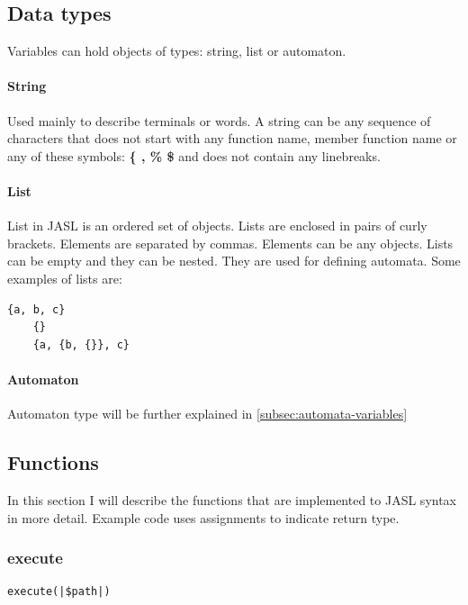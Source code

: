 \documentclass{ctuthesis}
\begin{document}
\subsection{Data types}
Variables can hold objects of types: string, list or automaton.
\paragraph{String} Used mainly to describe terminals or words. A string can be any sequence of characters that does not start with any function name, member function name or any of these symbols: \textbf{\{ , \% \$} and does not contain any linebreaks. 

\paragraph{List}
List in JASL is an ordered set of objects. Lists are enclosed in pairs of curly brackets. Elements are separated by commas. Elements can be any objects. Lists can be empty and they can be nested. They are used for defining automata. Some examples of lists are:

\begin{minipage}{\linewidth}
\begin{lstlisting}[language = JASL_snippet]
	{a, b, c}
	{}
	{a, {b, {}}, c}
\end{lstlisting}
\end{minipage}

\paragraph{Automaton}
Automaton type will be further explained in \ref{subsec:automata-variables}

\subsection{Functions}
\label{sec:functions}
In this section I will describe the functions that are implemented to JASL syntax in more detail. Example code uses assignments to indicate return type.

\subsubsection{execute}
\label{subsec:execute}
\begin{lstlisting}[language = JASL_snippet]
	execute(|$path|)
\end{lstlisting}
\end{document}
